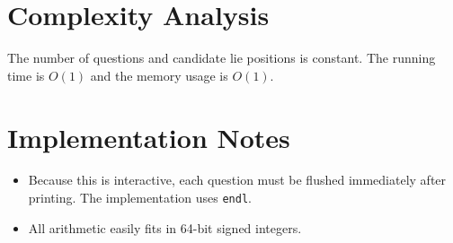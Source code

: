 \documentclass[11pt]{article}
\begin{document}
\section*{Complexity Analysis}

The number of questions and candidate lie positions is constant. The running time is $O(1)$ and the
memory usage is $O(1)$.

\section*{Implementation Notes}

\begin{itemize}[leftmargin=*]
    \item Because this is interactive, each question must be flushed immediately after printing. The
    implementation uses \texttt{endl}.
    \item All arithmetic easily fits in 64-bit signed integers.
\end{itemize}
\end{document}
